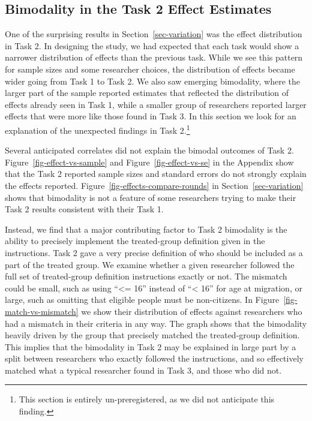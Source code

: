 \documentclass[
  letterpaper,
  DIV=11,
  numbers=noendperiod]{scrartcl}
\begin{document}
\subsection{Bimodality in the Task 2 Effect
Estimates}\label{sec-bimodal}

One of the surprising results in Section~\ref{sec-variation} was the
effect distribution in Task 2. In designing the study, we had expected
that each task would show a narrower distribution of effects than the
previous task. While we see this pattern for sample sizes and some
researcher choices, the distribution of effects became wider going from
Task 1 to Task 2. We also saw emerging bimodality, where the larger part
of the sample reported estimates that reflected the distribution of
effects already seen in Task 1, while a smaller group of researchers
reported larger effects that were more like those found in Task 3. In
this section we look for an explanation of the unexpected findings in
Task 2.\footnote{This section is entirely un-preregistered, as we did
  not anticipate this finding.}

Several anticipated correlates did not explain the bimodal outcomes of
Task 2. Figure~\ref{fig-effect-vs-sample} and
Figure~\ref{fig-effect-vs-se} in the Appendix show that the Task 2
reported sample sizes and standard errors do not strongly explain the
effects reported. Figure~\ref{fig-effects-compare-rounds} in
Section~\ref{sec-variation} shows that bimodality is not a feature of
some researchers trying to make their Task 2 results consistent with
their Task 1.

Instead, we find that a major contributing factor to Task 2 bimodality
is the ability to precisely implement the treated-group definition given
in the instructions. Task 2 gave a very precise definition of who should
be included as a part of the treated group. We examine whether a given
researcher followed the full set of treated-group definition
instructions exactly or not. The mismatch could be small, such as using
``\textless= 16'' instead of ``\textless{} 16'' for age at migration, or
large, such as omitting that eligible people must be non-citizens. In
Figure~\ref{fig-match-vs-mismatch} we show their distribution of effects
against researchers who had a mismatch in their criteria in any way. The
graph shows that the bimodality heavily driven by the group that
precisely matched the treated-group definition. This implies that the
bimodality in Task 2 may be explained in large part by a split between
researchers who exactly followed the instructions, and so effectively
matched what a typical researcher found in Task 3, and those who did
not.
\end{document}
